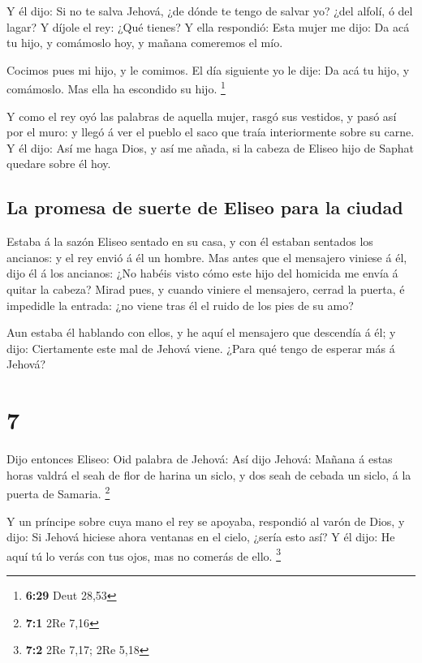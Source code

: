  Y él dijo: Si no te salva Jehová, ¿de dónde te tengo de
salvar yo? ¿del alfolí, ó del lagar?  Y díjole el rey:
¿Qué tienes? Y ella respondió: Esta mujer me dijo: Da acá tu hijo, y
comámoslo hoy, y mañana comeremos el mío.

 Cocimos pues mi hijo, y le comimos. El día siguiente yo
le dije: Da acá tu hijo, y comámoslo. Mas ella ha escondido su hijo.
\footnote{\textbf{6:29} Deut 28,53}

 Y como el rey oyó las palabras de aquella mujer, rasgó
sus vestidos, y pasó así por el muro: y llegó á ver el pueblo el saco
que traía interiormente sobre su carne.  Y él dijo: Así
me haga Dios, y así me añada, si la cabeza de Eliseo hijo de Saphat
quedare sobre él hoy.

\hypertarget{la-promesa-de-suerte-de-eliseo-para-la-ciudad}{%
\subsection{La promesa de suerte de Eliseo para la
ciudad}\label{la-promesa-de-suerte-de-eliseo-para-la-ciudad}}

 Estaba á la sazón Eliseo sentado en su casa, y con él
estaban sentados los ancianos: y el rey envió á él un hombre. Mas antes
que el mensajero viniese á él, dijo él á los ancianos: ¿No habéis visto
cómo este hijo del homicida me envía á quitar la cabeza? Mirad pues, y
cuando viniere el mensajero, cerrad la puerta, é impedidle la entrada:
¿no viene tras él el ruido de los pies de su amo?

 Aun estaba él hablando con ellos, y he aquí el mensajero
que descendía á él; y dijo: Ciertamente este mal de Jehová viene. ¿Para
qué tengo de esperar más á Jehová?

\hypertarget{section-6}{%
\section{7}\label{section-6}}

 Dijo entonces Eliseo: Oid palabra de Jehová: Así dijo
Jehová: Mañana á estas horas valdrá el seah de flor de harina un siclo,
y dos seah de cebada un siclo, á la puerta de Samaria. \footnote{\textbf{7:1}
  2Re 7,16}

 Y un príncipe sobre cuya mano el rey se apoyaba,
respondió al varón de Dios, y dijo: Si Jehová hiciese ahora ventanas en
el cielo, ¿sería esto así? Y él dijo: He aquí tú lo verás con tus ojos,
mas no comerás de ello. \footnote{\textbf{7:2} 2Re 7,17; 2Re 5,18}

